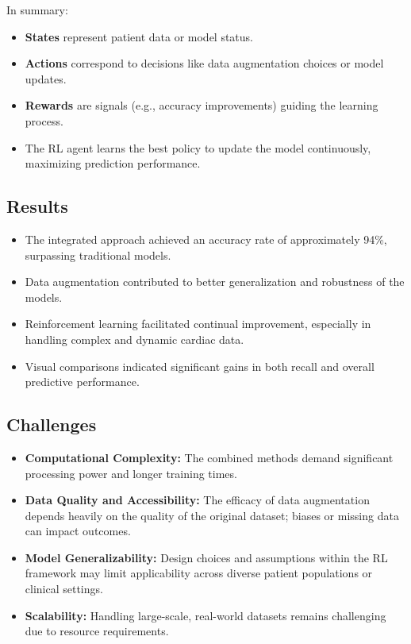 \noindent In summary:
\begin{itemize}
    \item \textbf{States} represent patient data or model status.
    \item \textbf{Actions} correspond to decisions like data augmentation choices or model updates.
    \item \textbf{Rewards} are signals (e.g., accuracy improvements) guiding the learning process.
    \item The RL agent learns the best policy to update the model continuously, maximizing prediction performance.
\end{itemize}

\subsection*{Results}
\begin{itemize}
    \item The integrated approach achieved an accuracy rate of approximately 94\%, surpassing traditional models.
    \item Data augmentation contributed to better generalization and robustness of the models.
    \item Reinforcement learning facilitated continual improvement, especially in handling complex and dynamic cardiac data.
    \item Visual comparisons indicated significant gains in both recall and overall predictive performance.
\end{itemize}

\subsection*{Challenges}
\begin{itemize}
    \item \textbf{Computational Complexity:} The combined methods demand significant processing power and longer training times.
    \item \textbf{Data Quality and Accessibility:} The efficacy of data augmentation depends heavily on the quality of the original dataset; biases or missing data can impact outcomes.
    \item \textbf{Model Generalizability:} Design choices and assumptions within the RL framework may limit applicability across diverse patient populations or clinical settings.
    \item \textbf{Scalability:} Handling large-scale, real-world datasets remains challenging due to resource requirements.
\end{itemize}

